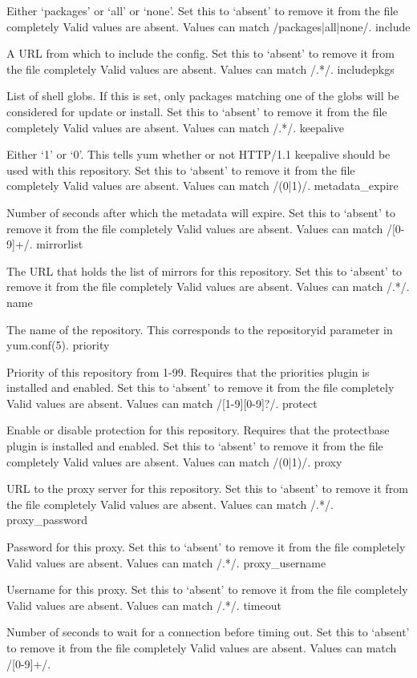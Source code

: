 Either ‘packages’ or ‘all’ or ‘none’. Set this to ‘absent’ to remove it from the file completely Valid values are absent. Values can match /packages|all|none/.
include

A URL from which to include the config. Set this to ‘absent’ to remove it from the file completely Valid values are absent. Values can match /.*/.
includepkgs

List of shell globs. If this is set, only packages matching one of the globs will be considered for update or install. Set this to ‘absent’ to remove it from the file completely Valid values are absent. Values can match /.*/.
keepalive

Either ‘1’ or ‘0’. This tells yum whether or not HTTP/1.1 keepalive should be used with this repository. Set this to ‘absent’ to remove it from the file completely Valid values are absent. Values can match /(0|1)/.
metadata_expire

Number of seconds after which the metadata will expire. Set this to ‘absent’ to remove it from the file completely Valid values are absent. Values can match /[0-9]+/.
mirrorlist

The URL that holds the list of mirrors for this repository. Set this to ‘absent’ to remove it from the file completely Valid values are absent. Values can match /.*/.
name

The name of the repository. This corresponds to the repositoryid parameter in yum.conf(5).
priority

Priority of this repository from 1-99. Requires that the priorities plugin is installed and enabled. Set this to ‘absent’ to remove it from the file completely Valid values are absent. Values can match /[1-9][0-9]?/.
protect

Enable or disable protection for this repository. Requires that the protectbase plugin is installed and enabled. Set this to ‘absent’ to remove it from the file completely Valid values are absent. Values can match /(0|1)/.
proxy

URL to the proxy server for this repository. Set this to ‘absent’ to remove it from the file completely Valid values are absent. Values can match /.*/.
proxy_password

Password for this proxy. Set this to ‘absent’ to remove it from the file completely Valid values are absent. Values can match /.*/.
proxy_username

Username for this proxy. Set this to ‘absent’ to remove it from the file completely Valid values are absent. Values can match /.*/.
timeout

Number of seconds to wait for a connection before timing out. Set this to ‘absent’ to remove it from the file completely Valid values are absent. Values can match /[0-9]+/.

